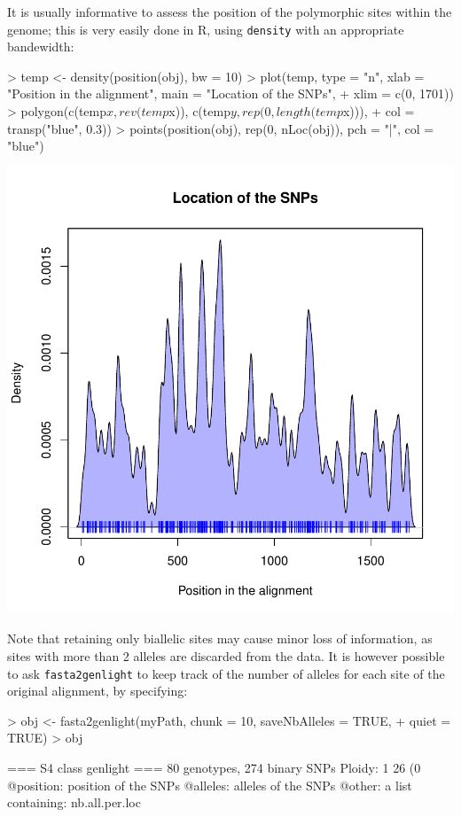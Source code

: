 \documentclass{article}
\begin{document}
\noindent It is usually informative to assess the position of the polymorphic sites within the
genome; this is very easily done in R, using \texttt{density} with an appropriate bandewidth:
\begin{Schunk}
\begin{Sinput}
> temp <- density(position(obj), bw = 10)
> plot(temp, type = "n", xlab = "Position in the alignment", main = "Location of the SNPs", 
+     xlim = c(0, 1701))
> polygon(c(temp$x, rev(temp$x)), c(temp$y, rep(0, length(temp$x))), 
+     col = transp("blue", 0.3))
> points(position(obj), rep(0, nLoc(obj)), pch = "|", col = "blue")
\end{Sinput}
\end{Schunk}
\includegraphics{figs/genomics-027}

\noindent Note that retaining only biallelic sites may cause minor loss of information, as sites
with more than 2 alleles are discarded from the data.
It is however possible to ask \texttt{fasta2genlight} to keep track of the number of alleles for
each site of the original alignment, by specifying:
\begin{Schunk}
\begin{Sinput}
> obj <- fasta2genlight(myPath, chunk = 10, saveNbAlleles = TRUE, 
+     quiet = TRUE)
> obj
\end{Sinput}
\begin{Soutput}
 === S4 class genlight ===
 80 genotypes,  274 binary SNPs
 Ploidy: 1
 26 (0 %
 @position: position of the SNPs
 @alleles: alleles of the SNPs
 @other: a list containing: nb.all.per.loc 
\end{Soutput}
\end{Schunk}
\end{document}
